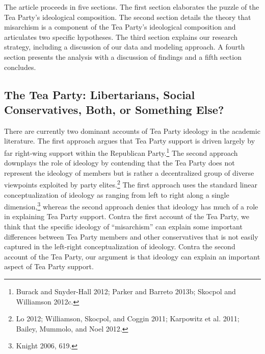 \documentclass[12pt,]{article}
\begin{document}
The article proceeds in five sections. The first section elaborates the
puzzle of the Tea Party's ideological composition. The second section
details the theory that misarchism is a component of the Tea Party's
ideological composition and articulates two specific hypotheses. The
third section explains our research strategy, including a discussion of
our data and modeling approach. A fourth section presents the analysis
with a discussion of findings and a fifth section concludes.

\subsection{The Tea Party: Libertarians, Social Conservatives, Both, or
Something
Else?}\label{the-tea-party-libertarians-social-conservatives-both-or-something-else}

There are currently two dominant accounts of Tea Party ideology in the
academic literature. The first approach argues that Tea Party support is
driven largely by far right-wing support within the Republican
Party.\footnote{Burack and Snyder-Hall 2012; Parker and Barreto 2013b;
  Skocpol and Williamson 2012c. } The second approach downplays the role
of ideology by contending that the Tea Party does not represent the
ideology of members but is rather a decentralized group of diverse
viewpoints exploited by party elites.\footnote{Lo 2012; Williamson,
  Skocpol, and Coggin 2011; Karpowitz et al. 2011; Bailey, Mummolo, and
  Noel 2012. } The first approach uses the standard linear
conceptualization of ideology as ranging from left to right along a
single dimension,\footnote{Knight 2006, 619. } whereas the second
approach denies that ideology has much of a role in explaining Tea Party
support. Contra the first account of the Tea Party, we think that the
specific ideology of ``misarchism'' can explain some important
differences between Tea Party members and other conservatives that is
not easily captured in the left-right conceptualization of ideology.
Contra the second account of the Tea Party, our argument is that
ideology can explain an important aspect of Tea Party support.
\end{document}
